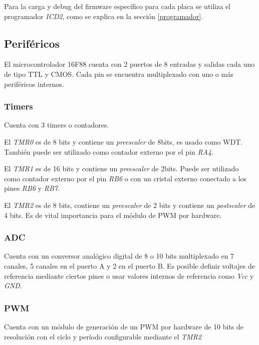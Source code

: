 \documentclass[a4paper,10pt]{article}
\begin{document}
Para la carga y debug del firmware espec\'ifico para cada placa se utiliza el programador \emph{ICD2}, como se explica en la secci\'on \ref{programador}.

\subsection{Perif\'ericos}
\label{perifericos}

El microcontrolador 16F88 cuenta con 2 puertos de 8 entradas y salidas cada uno de tipo TTL y CMOS.
Cada pin se encuentra multiplexado con uno o m\'as perif\'ericos internos.

\subsubsection{Timers}
\label{timers}

Cuenta con 3 timers o contadores.

El \emph{TMR0} es de 8 bits y contiene un \emph{preescaler} de 8bits, es usado como WDT.
Tambi\'en puede ser utilizado como contador externo por el pin \emph{RA4}.

El \emph{TMR1} es de 16 bits y contiene un \emph{preescaler} de 2bits.
Puede ser utilizado como contador externo por el pin \emph{RB6} o con un cristal externo conectado a los pines \emph{RB6} y \emph{RB7}.

El \emph{TMR2} es de 8 bits, contiene un \emph{preescaler} de 2 bits y contiene un \emph{postscaler} de 4 bits.
Es de vital importancia para el m\'odulo de PWM por hardware.

\subsubsection{ADC}
\label{adc}

Cuenta con un conversor anal\'ogico digital de 8 o 10 bits multiplexado en 7 canales, 5 canales en el puerto A y 2 en el puerto B.
Es posible definir voltajes de referencia mediante ciertos pines o usar valores internos de referencia como \emph{Vcc} y \emph{GND}.

\subsubsection{PWM}
\label{pwm}

Cuenta con un m\'odulo de generaci\'on de un PWM por hardware de 10 bits de resoluci\'on con el ciclo y per\'iodo configurable mediante el \emph{TMR2}
\end{document}
